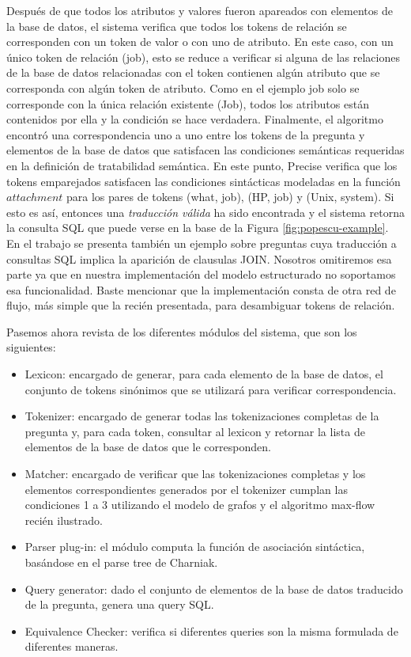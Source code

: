 Después de que todos los atributos y valores fueron apareados con elementos de la base de datos, el sistema verifica que todos los tokens de relación se corresponden con un token de valor o con uno de atributo. En este caso, con un único token de relación (job), esto se reduce a verificar si alguna de las relaciones de la base de datos relacionadas con el token contienen algún atributo que se corresponda con algún token de atributo. Como en el ejemplo job solo se corresponde con la única relación existente (Job), todos los atributos están contenidos por ella y la condición se hace verdadera. Finalmente, el algoritmo encontró una correspondencia uno a uno entre los tokens de la pregunta y elementos de la base de datos que satisfacen las condiciones semánticas requeridas en la definición de tratabilidad semántica. En este punto, Precise verifica que los tokens emparejados satisfacen las condiciones sintácticas modeladas en la función $attachment$ para los pares de tokens (what, job), (HP, job) y (Unix, system). Si esto es así, entonces una \textit{traducción válida} ha sido encontrada y el sistema retorna la consulta SQL que puede verse en la base de la Figura \ref{fig:popescu-example}. En el trabajo se presenta también un ejemplo sobre preguntas cuya traducción a consultas SQL implica la aparición de clausulas JOIN. Nosotros omitiremos esa parte ya que en nuestra implementación del modelo estructurado no soportamos esa funcionalidad. Baste mencionar que la implementación consta de otra red de flujo, más simple que la recién presentada, para desambiguar tokens de relación.

\bigskip

Pasemos ahora revista de los diferentes módulos del sistema,  que son los siguientes:

\begin{itemize}
  \item Lexicon: encargado de generar, para cada elemento de la base de datos, el conjunto de tokens sinónimos que se utilizará para verificar correspondencia.
  \item Tokenizer: encargado de generar todas las tokenizaciones completas de la pregunta y, para cada token, consultar al lexicon y retornar la lista de elementos de la base de datos que le corresponden.
  \item Matcher: encargado de verificar que las tokenizaciones completas y los elementos correspondientes generados por el tokenizer cumplan las condiciones 1 a 3 utilizando el modelo de grafos y el algoritmo max-flow recién ilustrado.
  \item Parser plug-in: el módulo computa la función de asociación sintáctica, basándose en el parse tree de Charniak.
  \item Query generator: dado el conjunto de elementos de la base de datos traducido de la pregunta, genera una query SQL.
  \item Equivalence Checker: verifica si diferentes queries son la misma formulada de diferentes maneras.
\end{itemize}

